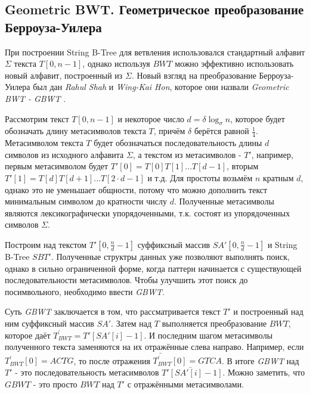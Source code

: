 \documentclass[a4paper,12pt]{article}
\begin{document}
\subsection{Geometric BWT. Геометрическое преобразование Берроуза-Уилера}
При построении String B-Tree для ветвления использовался стандартный алфавит $\Sigma$ текста $T[0,n-1]$, однако используя $BWT$ можно эффективно использовать новый алфавит, построенный из $\Sigma$. Новый взгляд на преобразование Берроуза-Уилера был дан \textit{Rahul Shah} и \textit{Wing-Kai Hon}, которое они назвали \textit{Geometric BWT - GBWT} \cite{chien2008geometric}.

Рассмотрим текст $T[0, n-1]$ и некоторое число $d = \delta \log_{\sigma}{n}$, которое будет обозначать длину метасимволов текста $T$, причём $\delta$ берётся равной $\frac{1}{4}$. Метасимволом текста $T$ будет обозначаться последовательность длины $d$ символов из исходного алфавита $\Sigma$, а текстом из метасимволов - $T'$, например, первым метасимволом будет $T'[0] = T[0]T[1]...T[d-1]$, вторым $T'[1] = T[d]T[d+1]...T[2 \cdot d-1]$ и т.д. Для простоты возьмём $n$ кратным $d$, однако это не уменьшает общности, потому что можно дополнить текст минимальным символом до кратности числу $d$. Полученные метасимволы являются лексикографически упорядоченными, т.к. состоят из упорядоченных символов $\Sigma$.

Построим над текстом $T'[0, \frac{n}{d} - 1]$ суффиксный массив $SA'[0, \frac{n}{d} - 1]$ и String B-Tree $SBT'$. Полученные структры данных уже позволяют выполнять поиск, однако в сильно ограниченной форме, когда паттерн начинается с существующей последовательности метасимволов. Чтобы улучшить этот поиск до посимвольного, необходимо ввести \textit{GBWT}.

Суть \textit{GBWT} заключается в том, что рассматривается текст $T'$ и построенный над ним суффиксный массив $SA'$. Затем над $T$ выполняется преобразование $BWT$, которое даёт $T_{BWT}^{'} = T'[SA'[i] - 1]$. И последним шагом метасимволы полученного текста заменяются на их отражённые слева направо. Например, если $T_{BWT}^{'}[0] = ACTG$, то после отражения $\overleftarrow{T_{BWT}^{'}}[0]=GTCA$. В итоге \textit{GBWT} над $T'$ - это последовательность метасимволов $\overleftarrow{T'[SA'[i] - 1]}$. Можно заметить, что $\textit{GBWT}$ - это просто $BWT$ над $T'$ с отражёнными метасимволами.
\end{document}
